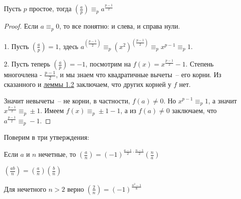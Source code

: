 \begin{theorem} \hypertarget{euler}{} Пусть $p$ простое, тогда $(\frac{a}{p})\equiv_pa^{\frac{p-1}{2}}$
\end{theorem}
\begin{proof}
Если $a\equiv_p 0$, то все понятно: и слева, и справа нули.

1. Пусть $(\frac{a}{p})=1$, здесь $a^{(\frac{p-1}{2})}\equiv_p (x^2)^{(\frac{p-1}{2})}\equiv_p {x^{p-1}\equiv_p 1}$.

2. Пусть теперь $(\frac{a}{p})=-1$, посмотрим на $f(x)=x^{\frac{p-1}{2}}-1$. Степень многочлена - $\frac{p-1}{2}$, и мы знаем что квадратичные вычеты~-- его корни. Из сказанного и \hyperlink{qresiduelemma}{леммы 1.2} заключаем, что других корней у $f$ нет. 

Значит невычеты~-- не корни, в частности, $f(a) \neq 0$. Но $x^{p-1}\equiv_p 1$, а значит $x^{\frac{p-1}{2}}\equiv_p \pm1$. Имеем $f(x) \equiv_p \pm1 - 1$, а из $f(a) \neq 0$ заключаем, что $a^\frac{p-1}{2} \equiv_p -1$.
\end{proof}

Поверим в три утверждения:
\begin{theorem} Если $a$ и $n$ нечетные, то
$(\frac{a}{n})=(-1)^{\frac{a-1}{2}\cdot\frac{n-1}{2}}(\frac{n}{a})$
\end{theorem}
\begin{theorem} \hypertarget{multiplicativity}{}
$(\frac{ab}{n})=(\frac{a}{n})(\frac{b}{n})$
\end{theorem} \hypertarget{twojacobi}{}
\begin{theorem} Для нечетного $n>2$ верно $(\frac{2}{n}) = (-1)^\frac{n^2-1}{8}$
\end{theorem}

